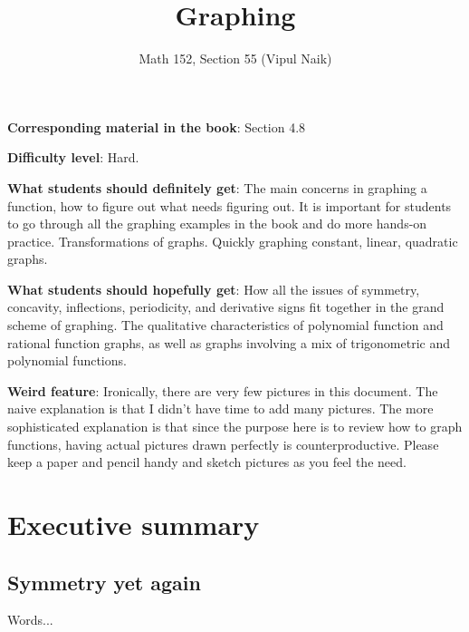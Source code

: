 \documentclass[10pt]{amsart}
\title{Graphing}
\author{Math 152, Section 55 (Vipul Naik)}
\begin{document}
\maketitle

{\bf Corresponding material in the book}: Section 4.8

{\bf Difficulty level}: Hard.

{\bf What students should definitely get}: The main concerns in
graphing a function, how to figure out what needs figuring out. It is
important for students to go through all the graphing examples in the
book and do more hands-on practice. Transformations of graphs. Quickly
graphing constant, linear, quadratic graphs.

{\bf What students should hopefully get}: How all the issues of
symmetry, concavity, inflections, periodicity, and derivative signs
fit together in the grand scheme of graphing. The qualitative
characteristics of polynomial function and rational function graphs,
as well as graphs involving a mix of trigonometric and polynomial
functions.

{\bf Weird feature}: Ironically, there are very few pictures in this
document. The naive explanation is that I didn't have time to add many
pictures. The more sophisticated explanation is that since the purpose
here is to review how to graph functions, having actual pictures drawn
perfectly is counterproductive. Please keep a paper and pencil handy
and sketch pictures as you feel the need.

\section*{Executive summary}

\subsection{Symmetry yet again}

Words...
\end{document}
